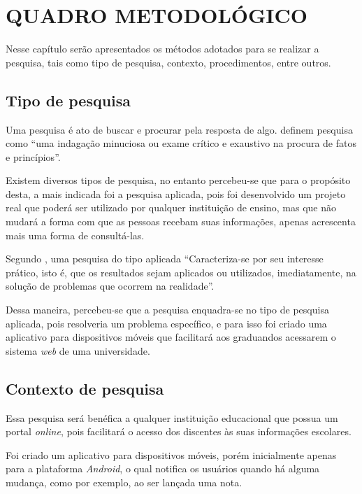 \chapter{QUADRO METODOLÓGICO}

	\par Nesse capítulo serão apresentados os métodos adotados para se realizar a
pesquisa, tais como tipo de pesquisa, contexto, procedimentos, entre outros.

\section{Tipo de pesquisa}
	
	\par Uma pesquisa é ato de buscar e procurar pela resposta de algo.
 definem pesquisa como “uma indagação minuciosa
ou exame crítico e exaustivo na procura de fatos e princípios”.

	\par Existem diversos tipos de pesquisa, no entanto percebeu-se que para o
propósito desta, a mais indicada foi a pesquisa aplicada, pois foi desenvolvido
um projeto real que poderá ser utilizado por qualquer instituição de ensino,
mas que não mudará a forma com que as pessoas recebam suas informações, apenas
acrescenta mais uma forma de consultá-las.

	\par Segundo , uma pesquisa do tipo aplicada
“Caracteriza-se por seu interesse prático, isto é, que os resultados sejam
aplicados ou utilizados, imediatamente, na solução de problemas que ocorrem na
realidade”.

	\par Dessa maneira, percebeu-se que a pesquisa enquadra-se no tipo de
	pesquisa aplicada, pois resolveria um problema específico, e para isso foi criado uma
aplicativo para dispositivos móveis que facilitará aos graduandos acessarem o
sistema \textit{web} de uma universidade.

\section{Contexto de pesquisa}

	\par Essa pesquisa será benéfica a qualquer instituição educacional que possua
um portal \textit{online}, pois facilitará o acesso dos discentes às suas
informações escolares.

	\par Foi criado um aplicativo para dispositivos móveis, porém inicialmente
apenas para a plataforma \textit{Android}, o qual notifica os usuários quando
há alguma mudança, como por exemplo, ao ser lançada uma nota.
	
